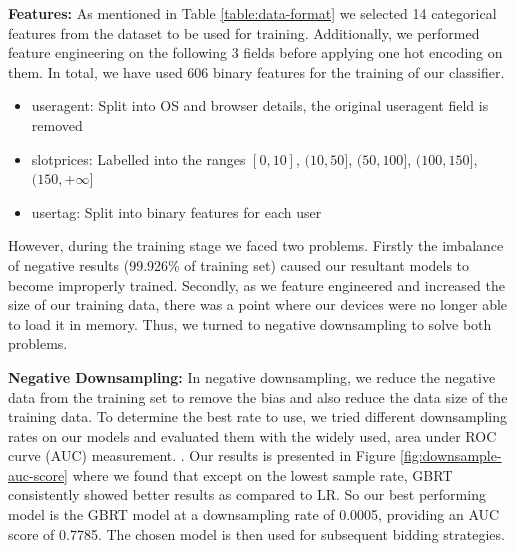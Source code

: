 \documentclass{sig-alternate-05-2015}
\begin{document}
\textbf{Features:} As mentioned in Table \ref{table:data-format} we selected 14 categorical features from the dataset to be used for training. Additionally, we performed feature engineering on the following 3 fields before applying one hot encoding on them. In total, we have used 606 binary features for the training of our classifier.

\begin{itemize}
    \item useragent: Split into OS and browser details, the original useragent field is removed
    \item slotprices: Labelled into the ranges $[0,10]$, $(10,50]$, $(50,100]$, $(100, 150]$, $(150,+\infty]$
    \item usertag: Split into binary features for each user
\end{itemize}

However, during the training stage we faced two problems. Firstly the imbalance of negative results (99.926\% of training set) caused our resultant models to become improperly trained. Secondly, as we feature engineered and increased the size of our training data, there was a point where our devices were no longer able to load it in memory. Thus, we turned to negative downsampling \cite{he_practical_2014} to solve both problems. 

\textbf{Negative Downsampling:} In negative downsampling, we reduce the negative data from the training set to remove the bias and also reduce the data size of the training data. To determine the best rate to use, we tried different downsampling rates on our models and evaluated them with the widely used, area under ROC curve (AUC) measurement. \cite{ferro_deep_2016, DBLP:conf/icml/GraepelCBH10}. Our results is presented in Figure \ref{fig:downsample-auc-score} where we found that except on the lowest sample rate, GBRT consistently showed better results as compared to LR. So our best performing model is the GBRT model at a downsampling rate of 0.0005, providing an AUC score of 0.7785. The chosen model is then used for subsequent bidding strategies. 
	
\end{document}
